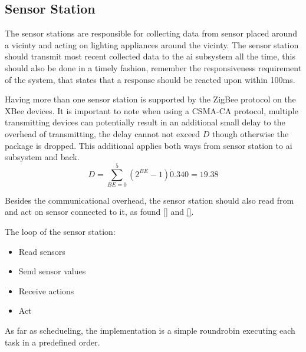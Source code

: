 \subsection{Sensor Station}\label{sub:sensorStation}

The sensor stations are responsible for collecting data from sensor placed around a vicinty and acting on lighting appliances around the vicinty. The sensor station should transmit most recent collected data to the ai subsystem all the time, this should also be done in a timely fashion, remember the responsiveness requirement of the system, that states that a response should be reacted upon within 100ms.

Having more than one sensor station is supported by the ZigBee protocol on the XBee devices. It is important to note when using a CSMA-CA protocol, multiple transmitting devices can potentially result in an additional small delay to the overhead of transmitting, the delay cannot not exceed $D$ though otherwise the package is dropped. This additional applies both ways from sensor station to ai subsystem and back.
\begin{equation*}
D = \sum\limits_{BE=0}^{5}(2^{BE} - 1)\dot 0.340 = 19.38
\end{equation*}

Besides the communicational overhead, the sensor station should also read from and act on sensor connected to it,  as found \cref{} and \cref{}.

The loop of the sensor station:
\begin{itemize}
  \item Read sensors
  \item Send sensor values
  \item Receive actions
  \item Act
\end{itemize}

As far as schedueling, the implementation is a simple roundrobin executing each task in a predefined order.
